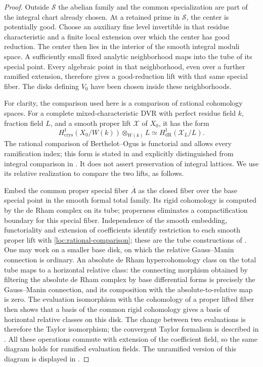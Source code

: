 \begin{proof}
Outside $\mathcal S$ the abelian family and the common specialization
are part of the integral chart already chosen.  At a retained prime in
$\mathcal S$, the center is potentially good.  Choose an auxiliary
fine level invertible in that residue characteristic and a finite
local extension over which the center has good reduction.  The center
then lies in the interior of the smooth integral moduli space.  A
sufficiently small fixed analytic neighborhood maps into the tube of
its special point.  Every algebraic point in that neighborhood, even
over a further ramified extension, therefore gives a good-reduction
lift with that same special fiber.  The disks defining $V_0$ have been
chosen inside these neighborhoods.

For clarity, the comparison used here is a comparison of rational
cohomology spaces.  For a complete mixed-characteristic DVR with
perfect residue field $k$, fraction field $L$, and a smooth proper
lift $\mathscr X$ of $X_0$, it has the form
\begin{equation}\label{loc:rational-comparison}
 H^1_{\mathrm{crys}}(X_0/W(k))\otimes_{W(k)}L
   \simeq H^1_{\mathrm{dR}}(\mathscr X_L/L).
\end{equation}
The rational comparison of Berthelot--Ogus
\cite{BerthelotOgus1983} is functorial and allows every ramification
index; this form is stated in \cite[\S1.2]{Berthelot1982} and explicitly
distinguished from integral comparison in
\cite[Introduction, equations~(2)--(3)]{AbhinandanYoucis2025}.
It does not assert preservation of integral lattices.  We use its
relative realization to compare the two lifts, as follows.

Embed the common proper special fiber $\overline A$ as the closed fiber
over the base special point in the smooth formal total family.  Its
rigid cohomology is computed by the de Rham complex on its tube;
properness eliminates a compactification boundary for this special
fiber.  Independence of the smooth embedding, functoriality and
extension of coefficients identify restriction to each smooth proper
lift with \eqref{loc:rational-comparison}; these are the tube
constructions of \cite[\S\S1.4--1.5 and 2.5(c)]{Berthelot1982}.
One may work on a smaller base disk, on which the relative
Gauss--Manin connection is ordinary.  An absolute de Rham
hypercohomology class on the total tube maps to a horizontal relative
class: the connecting morphism obtained by filtering the absolute
de Rham complex by base differential forms is precisely the Gauss--Manin
connection, and its composition with the absolute-to-relative map is zero.
The evaluation isomorphism with the cohomology of a proper lifted
fiber then shows that a basis of the common rigid cohomology gives a
basis of horizontal relative classes on this disk.  The change
between two evaluations is therefore the Taylor isomorphism; the
convergent Taylor formalism is described in
\cite[\S4.1]{Berthelot1982}.
All these operations commute with extension of the coefficient field,
so the same diagram holds for ramified evaluation fields.  The
unramified version of this diagram is displayed in
\cite[\S3.3, diagram~(3.9)]{LawrenceVenkatesh2020}.


\end{proof}

